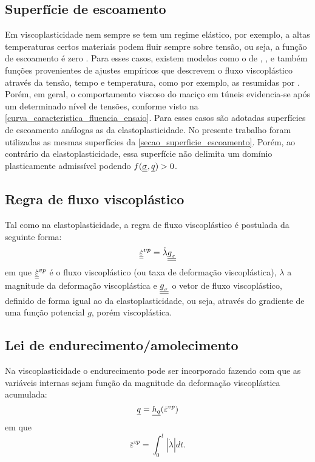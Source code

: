 \subsection{Superfície de escoamento}

Em viscoplasticidade nem sempre se tem um regime elástico, por exemplo, a altas temperaturas certos materiais podem fluir sempre sobre tensão, ou seja, a função de escoamento é zero \cite[p. 448]{Neto2008}. Para esses casos, existem modelos como o de , , e também funções provenientes de ajustes empíricos que descrevem o fluxo viscoplástico através da tensão, tempo e temperatura, como por exemplo, as resumidas por . Porém, em geral, o comportamento viscoso do maciço em túneis evidencia-se após um determinado nível de tensões, conforme visto na \autoref{curva_caracteristica_fluencia_ensaio}. Para esses casos são adotadas superfícies de escoamento análogas as da elastoplasticidade. No presente trabalho foram utilizadas as mesmas superfícies da \autoref{secao_superficie_escoamento}. Porém, ao contrário da elastoplasticidade, essa superfície não delimita um domínio plasticamente admissível podendo $f(\underline{\underline \sigma},\underline q) > 0$.

\subsection{Regra de fluxo viscoplástico}
Tal como na elastoplasticidade, a regra de fluxo viscoplástico é postulada da seguinte forma:
\begin{equation}
	\label{eq:fluxo_viscoplastico}
	\dot {\underline{\underline \varepsilon}}^{vp} = \dot \lambda \underline{\underline {g_{_\sigma}}}
\end{equation}
em que $\dot {\underline{\underline \varepsilon}}^{vp}$ é o fluxo viscoplástico (ou taxa de deformação viscoplástica), $\lambda$ a magnitude da deformação viscoplástica e $\underline{\underline {g_{_\sigma}}}$ o vetor de fluxo viscoplástico, definido de forma igual ao da elastoplasticidade, ou seja, através do gradiente de uma função potencial $g$, porém viscoplástica.

\subsection{Lei de endurecimento/amolecimento}
Na viscoplasticidade o endurecimento pode ser incorporado fazendo com que as variáveis internas sejam função da magnitude da deformação viscoplástica acumulada:
\begin{equation}
	\label{eq:endurecimento_viscoplastico}
	\underline q=\underline{h_q}(\bar{\varepsilon}^{vp})
\end{equation}
em que
\begin{equation}
	\label{eq:epslonvpbar}
	\bar{\varepsilon}^{vp} = \int_{0}^{t}|\dot \lambda|dt.
\end{equation}

